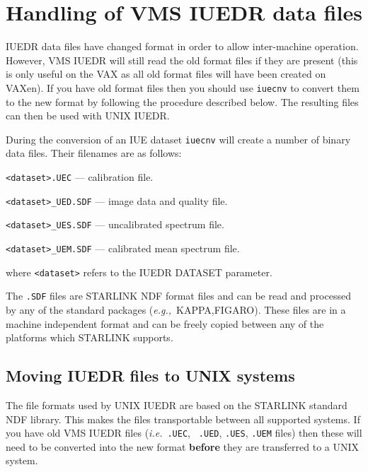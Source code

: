 \newpage
\section{\label{se:vmsunix}Handling of VMS IUEDR data files}

IUEDR data files have changed format in order to allow
inter-machine operation. However, VMS IUEDR will still read the old format
files if they are present (this is only useful on the VAX as all old
format files will have been created on VAXen). If you have old format files
then you should use \verb+iuecnv+ to convert them to the new format by
following the procedure described below.
The resulting files can then be used with UNIX IUEDR.

During the conversion of an IUE dataset \verb+iuecnv+ will create a number of
binary data files. Their filenames are as follows:

\begin {description}
   \item \verb+<dataset>.UEC+ --- calibration file.
   \item \verb+<dataset>_UED.SDF+ --- image data and quality file.
   \item \verb+<dataset>_UES.SDF+ --- uncalibrated spectrum file.
   \item \verb+<dataset>_UEM.SDF+ --- calibrated mean spectrum file.
\end {description}

where \verb+<dataset>+ refers to the IUEDR DATASET parameter.

The {\tt .SDF} files are STARLINK NDF format files and can be read and
processed by any of the standard  packages ({\it{e.g.,}}\ KAPPA,FIGARO).
These files are in a machine independent format and can be freely
copied between any of the platforms which STARLINK supports.

\subsection{Moving IUEDR files to UNIX systems}

The file formats used by UNIX IUEDR are based on the STARLINK standard
NDF library. This makes the files transportable between all supported
systems. If you have old VMS IUEDR files ({\it{i.e.}}\ {\tt .UEC}, {\tt
.UED}, {\tt .UES}, {\tt .UEM} files) then these will need to be
converted into the new format {\bf before} they are transferred to a UNIX
system.

